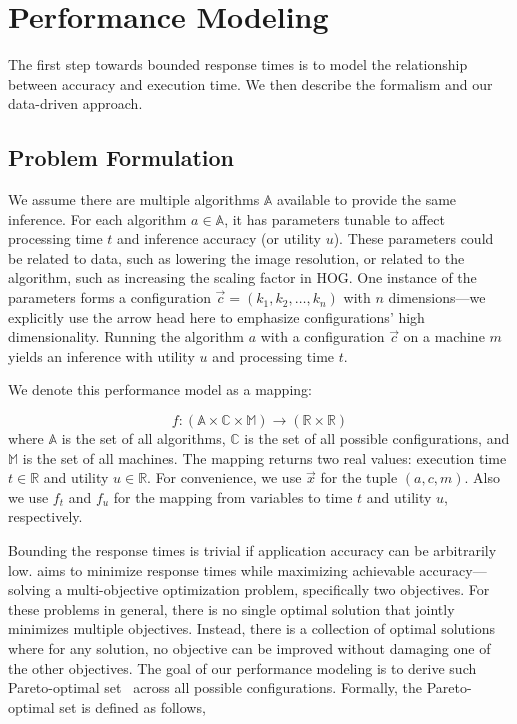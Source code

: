 \section{Performance Modeling}
\label{sec:performance-modeling}

The first step towards bounded response times is to model the relationship
between accuracy and execution time. We then describe the formalism and our
data-driven approach.

\subsection{Problem Formulation}
\label{sec:problem-formulation}

We assume there are multiple algorithms $\mathbb{A}$ available to provide the
same inference. For each algorithm $a \in \mathbb{A}$, it has parameters tunable
to affect processing time $t$ and inference accuracy (or utility $u$). These
parameters could be related to data, such as lowering the image resolution, or
related to the algorithm, such as increasing the scaling factor in HOG. One
instance of the parameters forms a configuration
$\vec{c} = (k_1, k_2, \dots, k_n)$ with $n$ dimensions---we explicitly use the
arrow head here to emphasize configurations' high dimensionality. Running the
algorithm $a$ with a configuration $\vec{c}$ on a machine $m$ yields an
inference with utility $u$ and processing time $t$.

We denote this performance model as a mapping:

{\small \vspace{-1em}
  \begin{equation*}
f: (\mathbb{A} \times \mathbb{C} \times \mathbb{M}) \rightarrow
(\mathbb{R}\times \mathbb{R})
\end{equation*}
} where $\mathbb{A}$ is the set of all algorithms, $\mathbb{C}$ is the set of
all possible configurations, and $\mathbb{M}$ is the set of all machines. The
mapping returns two real values: execution time $t \in \mathbb{R}$ and utility
$u \in \mathbb{R}$. For convenience, we use $\vec{x}$ for the tuple $(a, c, m)$.
Also we use $f_t$ and $f_u$ for the mapping from variables to time $t$ and
utility $u$, respectively.

Bounding the response times is trivial if application accuracy can be
arbitrarily low. \sysname{} aims to minimize response times while maximizing
achievable accuracy---solving a multi-objective optimization problem,
specifically two objectives. For these problems in general, there is no single
optimal solution that jointly minimizes multiple objectives. Instead, there is a
collection of optimal solutions where for any solution, no objective can be
improved without damaging one of the other objectives. The goal of our
performance modeling is to derive such Pareto-optimal
set~\cite{collette2013multiobjective} across all possible
configurations. Formally, the Pareto-optimal set is defined as follows,

